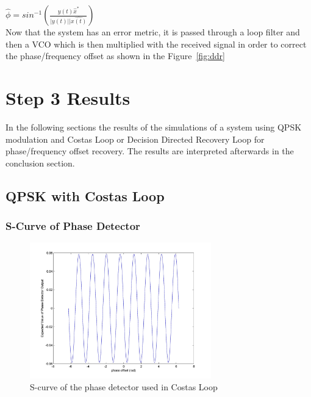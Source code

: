 \documentclass[]{article}
\begin{document}
$\hat{\phi} = sin^{-1}\left(\frac{y(t)\hat{x}^*}{|y(t)||\hat{x(t)}}\right)  $\\

Now that the system has an error metric, it is passed through a loop filter and then a VCO which is then multiplied with the received signal in order to correct the phase/frequency offset as shown in the Figure~\ref{fig:ddr}




\newpage
\section{Step 3 Results}
In the following sections the results of the simulations of a system using QPSK modulation and Costas Loop or Decision Directed Recovery Loop for phase/frequency offset recovery. The results are interpreted afterwards in the conclusion section.

\subsection{QPSK with Costas Loop}

\subsubsection{S-Curve of Phase Detector}
\begin{figure}[H]
\centering
\hspace*{-2cm}\includegraphics[width=0.7\textwidth]{qpScurvepo_costas.jpg}
\caption{S-curve of the phase detector used in Costas Loop \label{fig:costasSphase}}
\end{figure}
\end{document}
